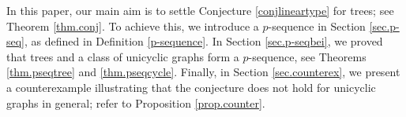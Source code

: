 \documentclass[11pt,a4paper,reqno]{amsart}
\theoremstyle{definition}
\begin{document}
\vspace{2mm}

In this paper, our main aim is to settle Conjecture \ref{conjlineartype} for trees; see Theorem \ref{thm.conj}. To achieve this, we introduce a $p$-sequence in Section \ref{sec.p-seq}, as defined in Definition \ref{p-sequence}. 
In Section \ref{sec.p-seqbei}, we proved that trees and a class of unicyclic graphs form a $p$-sequence, see Theorems \ref{thm.pseqtree} and \ref{thm.pseqcycle}. Finally, in Section \ref{sec.counterex}, we present a counterexample illustrating that the conjecture does not hold for unicyclic graphs in general; refer to Proposition \ref{prop.counter}.

\vspace{2mm}



\vspace{2mm}

\end{document}
